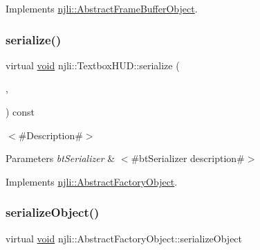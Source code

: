 Implements \mbox{\hyperlink{classnjli_1_1_abstract_frame_buffer_object_aa75a537f5745e4be8f749892d195b43c}{njli\+::\+Abstract\+Frame\+Buffer\+Object}}.

\mbox{\label{classnjli_1_1_textbox_h_u_d_a0d9380b019b96de234c7a098ddbf5c7b}} 
\subsubsection{\texorpdfstring{serialize()}{serialize()}}
{\footnotesize\ttfamily virtual \mbox{\hyperlink{_thread_8h_af1e856da2e658414cb2456cb6f7ebc66}{void}} njli\+::\+Textbox\+H\+U\+D\+::serialize (\begin{DoxyParamCaption}\item[{\mbox{\hyperlink{_thread_8h_af1e856da2e658414cb2456cb6f7ebc66}{void}} $\ast$}]{,  }\item[{bt\+Serializer $\ast$}]{ }\end{DoxyParamCaption}) const\hspace{0.3cm}{\ttfamily [virtual]}}

$<$\#\+Description\#$>$


\begin{DoxyParams}{Parameters}
{\em bt\+Serializer} & $<$\#bt\+Serializer description\#$>$ \\
\hline
\end{DoxyParams}


Implements \mbox{\hyperlink{classnjli_1_1_abstract_factory_object_aad2fbe86fb3bdecf02918a96b9c57976}{njli\+::\+Abstract\+Factory\+Object}}.

\mbox{\label{classnjli_1_1_textbox_h_u_d_a4fc4bcd9d1930911474210c047372fc0}} 
\subsubsection{\texorpdfstring{serialize\+Object()}{serializeObject()}}
{\footnotesize\ttfamily virtual \mbox{\hyperlink{_thread_8h_af1e856da2e658414cb2456cb6f7ebc66}{void}} njli\+::\+Abstract\+Factory\+Object\+::serialize\+Object}

